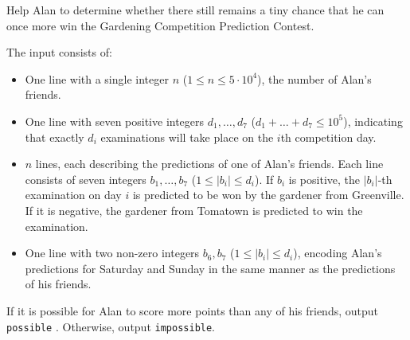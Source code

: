 Help Alan to determine whether there still remains a tiny chance that he can once more win the Gardening Competition Prediction Contest.

\begin{Input}
  The input consists of:
  \begin{itemize}
    \item One line with a single integer $n$ ($1 \leq n \leq 5 \cdot 10^4$), the number of Alan's friends.
	\item One line with seven positive integers $d_1, \ldots, d_7$ ($d_1 + \dots + d_7 \leq 10^5$), indicating that exactly $d_i$ examinations will take place on the $i$th competition day.
	\item $n$ lines, each describing the predictions of one of Alan's friends. Each line consists of seven integers $b_{1}, \ldots, b_{7}$ ($1 \leq |b_i| \leq d_i$). If $b_{i}$ is positive, the $|b_{i}|$-th examination on day $i$ is predicted to be won by the gardener from Greenville. If it is negative, the gardener from Tomatown is predicted to win the examination.
	\item One line with two non-zero integers $b_{6}, b_{7}$ ($1 \leq |b_i| \leq d_i$), encoding Alan's predictions for Saturday and Sunday in the same manner as the predictions of his friends.
  \end{itemize}
\end{Input}

\begin{Output}
If it is possible for Alan  to score more points than any of his friends, output \texttt{possible} . Otherwise, output \texttt{impossible}.

\end{Output}
